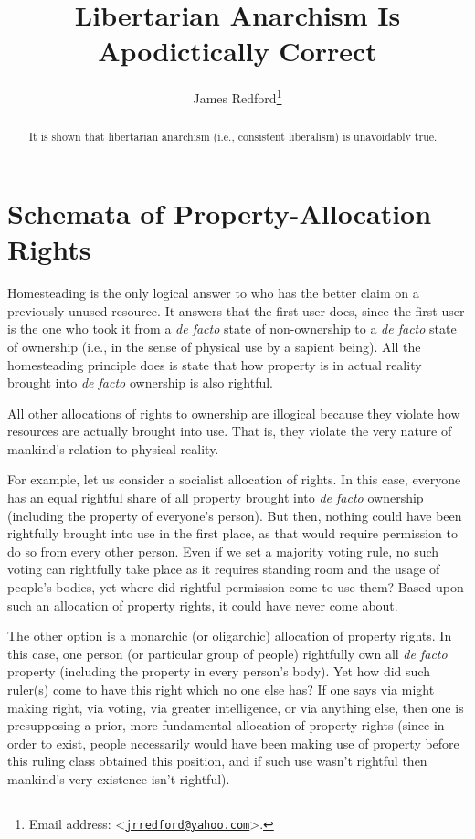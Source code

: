 \documentclass[letterpaper,12pt]{article}
\title{Libertarian Anarchism Is Apodictically Correct}
\author{James Redford\footnote{Email address: \textless\href{mailto:jrredford@yahoo.com}{\nolinkurl{jrredford@yahoo.com}}\textgreater .}}
\begin{document}
\maketitle

\renewcommand{\abstractname}{\textsc{Abstract}}
\setlength{\absparindent}{0.5em}
\begin{abstract}
It is shown that libertarian anarchism (i.e., consistent liberalism) is unavoidably true.
\end{abstract}

\section{Schemata of Property-Allocation Rights}
\label{sec:SchemataOfProperty-AllocationRights}

Homesteading is the only logical answer to who has the better claim on a previously unused resource. It answers that the first user does, since the first user is the one who took it from a \emph{de facto} state of non-ownership to a \emph{de facto} state of ownership (i.e., in the sense of physical use by a sapient being). All the homesteading principle does is state that how property is in actual reality brought into \emph{de facto} ownership is also rightful.

All other allocations of rights to ownership are illogical because they violate how resources are actually brought into use. That is, they violate the very nature of mankind's relation to physical reality.

For example, let us consider a socialist allocation of rights. In this case, everyone has an equal rightful share of all property brought into \emph{de facto} ownership (including the property of everyone's person). But then, nothing could have been rightfully brought into use in the first place, as that would require permission to do so from every other person. Even if we set a majority voting rule, no such voting can rightfully take place as it requires standing room and the usage of people's bodies, yet where did rightful permission come to use them? Based upon such an allocation of property rights, it could have never come about.

The other option is a monarchic (or oligarchic) allocation of property rights. In this case, one person (or particular group of people) rightfully own all \emph{de facto} property (including the property in every person's body). Yet how did such ruler(s) come to have this right which no one else has? If one says via might making right, via voting, via greater intelligence, or via anything else, then one is presupposing a prior, more fundamental allocation of property rights (since in order to exist, people necessarily would have been making use of property before this ruling class obtained this position, and if such use wasn't rightful then mankind's very existence isn't rightful).
\end{document}

